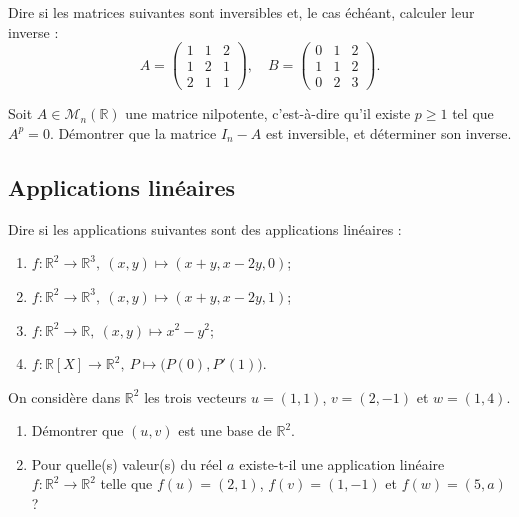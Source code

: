 \documentclass{book}
\begin{document}
\begin{Exercice}

Dire si les matrices suivantes sont inversibles et, le
cas échéant, calculer leur inverse :
$$A=\left(
\begin{array}{rcl}
1&1&2\\
1&2&1\\
2&1&1
\end{array}
\right),\quad
B=\left(
\begin{array}{rcl}
0&1&2\\
1&1&2\\
0&2&3
\end{array}
\right).$$
\end{Exercice}

\begin{Exercice}

Soit $A\in\mathcal M_n(\mathbb R)$ une matrice nilpotente, c'est-à-dire qu'il existe $p\geq 1$ tel que $A^p=0$. Démontrer que la matrice $I_n-A$ est inversible, et déterminer son inverse.
\end{Exercice}



\subsection{Applications linéaires}
\begin{Exercice}
Dire si les applications suivantes sont des applications linéaires :
\begin{enumerate}
\item $f:\mathbb R^2\to\mathbb R^3,\ (x,y)\mapsto (x+y,x-2y,0)$;
\item $f:\mathbb R^2\to\mathbb R^3,\ (x,y)\mapsto (x+y,x-2y,1)$;
\item $f:\mathbb R^2\to\mathbb R,\ (x,y)\mapsto x^2-y^2$;
\item $f:\mathbb R[X]\to \mathbb R^2,\ P\mapsto \big(P(0),P'(1)\big)$.
\end{enumerate}
\end{Exercice}

\begin{Exercice}

On considère dans $\mathbb R^2$ les trois vecteurs $u=(1,1)$, $v=(2,-1)$ et $w=(1,4)$.
\begin{enumerate}
\item Démontrer que $(u,v)$ est une base de $\mathbb R^2$.
\item Pour quelle(s) valeur(s) du réel $a$ existe-t-il une application linéaire $f:\mathbb R^2\to \mathbb R^2$
telle que $f(u)=(2,1)$, $f(v)=(1,-1)$ et $f(w)=(5,a)$?
\end{enumerate}
\end{Exercice}
\end{document}
